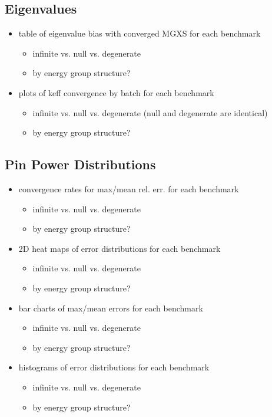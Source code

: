\subsection{Eigenvalues}

\begin{itemize}[noitemsep]
  \item table of eigenvalue bias with converged MGXS for each benchmark
  \begin{itemize}[noitemsep]
    \item infinite vs. null vs. degenerate
    \item by energy group structure?
  \end{itemize}
  \item plots of keff convergence by batch for each benchmark
  \begin{itemize}[noitemsep]
    \item infinite vs. null vs. degenerate (null and degenerate are identical)
    \item by energy group structure?
  \end{itemize}
\end{itemize}

\subsection{Pin Power Distributions}

\begin{itemize}[noitemsep]
  \item convergence rates for max/mean rel. err. for each benchmark
  \begin{itemize}[noitemsep]
    \item infinite vs. null vs. degenerate
    \item by energy group structure?
  \end{itemize}
  \item 2D heat maps of error distributions for each benchmark
  \begin{itemize}[noitemsep]
    \item infinite vs. null vs. degenerate
    \item by energy group structure?
  \end{itemize}
  \item bar charts of max/mean errors for each benchmark
  \begin{itemize}[noitemsep]
    \item infinite vs. null vs. degenerate
    \item by energy group structure?
  \end{itemize}
  \item histograms of error distributions for each benchmark
  \begin{itemize}[noitemsep]
    \item infinite vs. null vs. degenerate
    \item by energy group structure?
  \end{itemize}
\end{itemize}

